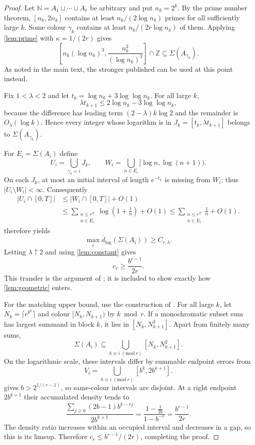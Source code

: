 \documentclass[11pt,a4paper]{article}
\theoremstyle{plain}
\theoremstyle{definition}
\theoremstyle{remark}
\newcommand{\N}{\mathbb N}
\newcommand{\dlog}{\overline d_{\log}}
\begin{document}
\label{pf:main}
\thmmain*
\begin{proof}
Let $\N=A_1\sqcup\cdots\sqcup A_r$ be arbitrary and put $n_k=2^k$.
By the prime number theorem, $[n_k,2n_k]$ contains at least
$n_k/(2\log n_k)$ primes for all sufficiently large $k$. Some colour
$\gamma_k$ contains at least $n_k/(2r\log n_k)$ of them. Applying
\cref{lem:prime} with $\kappa=1/(2r)$ gives
\begin{equation}\label{eq:primeinterval}
 \left[n_k(\log n_k)^3,\frac{n_k^2}{(\log n_k)^3}\right]\cap\mathbb Z
 \subseteq\Sigma(A_{\gamma_k}).
\end{equation}
As noted in the main text, the stronger published
\cite[Lemma~2]{CFP22} can be used at this point instead.

Fix $1<\lambda<2$ and let
$t_k=\log n_k+3\log\log n_k$. For all large $k$,
\[
 \lambda t_{k+1}\le2\log n_k-3\log\log n_k,
\]
because the difference has leading term $(2-\lambda)k\log2$ and the
remainder is $O_\lambda(\log k)$. Hence every integer whose logarithm is
in $J_k=[t_k,\lambda t_{k+1}]$ belongs to
$\Sigma(A_{\gamma_k})$.

For $E_i=\Sigma(A_i)$ define
\[
 U_i=\bigcup_{\gamma_k=i}J_k,\qquad
 W_i=\bigcup_{n\in E_i}[\log n,\log(n+1)).
\]
On each $J_k$, at most an initial interval of length $e^{-t_k}$ is
missing from $W_i$; thus $|U_i\setminus W_i|<\infty$. Consequently
\[
\begin{aligned}
 |U_i\cap[0,T]|
 &\le |W_i\cap[0,T]|+O(1)\\
 &\le\sum_{\substack{n\le e^T\\n\in E_i}}
 \log\left(1+\frac1n\right)+O(1)
 \le\sum_{\substack{n\le e^T\\n\in E_i}}\frac1n+O(1).
\end{aligned}
\]
 therefore yields
\[
 \max_i\dlog(\Sigma(A_i))\ge C_{r,\lambda}.
\]
Letting $\lambda\uparrow2$ and using \cref{lem:constant} gives
\[
 c_r\ge\frac{b^{r-1}}{2r}.
\]
This transfer is the argument of \cite[\S3 and Lemma~6]{CFP22}; it is
included to show exactly how \cref{lem:geometric} enters.

For the matching upper bound, use the construction of
\cite[Theorem~1]{CFP22}. For all large $k$, let
$N_k=\lceil e^{b^k}\rceil$ and colour $[N_k,N_{k+1})$ by $k\bmod r$.
If a monochromatic subset sum has largest summand in block $k$, it lies
in $[N_k,N_{k+1}^2]$. Apart from finitely many sums,
\[
 \Sigma(A_i)\subseteq
 \bigcup_{k\equiv i\;(\mathrm{mod}\ r)}[N_k,N_{k+1}^2].
\]
On the logarithmic scale, these intervals differ by summable endpoint
errors from
\[
 V_i=\bigcup_{k\equiv i\;(\mathrm{mod}\ r)}[b^k,2b^{k+1}].
\]
 gives $b>2^{1/(r-1)}$, so same-colour intervals are
disjoint. At a right endpoint $2b^{k+1}$ their accumulated density tends
to
\[
 \frac{\sum_{j\ge0}(2b-1)b^{k-rj}}{2b^{k+1}}
 =\frac{1-\frac1{2b}}{1-b^{-r}}
 =\frac{b^{r-1}}{2r}.
\]
The density ratio increases within an occupied interval and decreases in
a gap, so this is its limsup. Therefore
$c_r\le b^{r-1}/(2r)$, completing the proof.
\end{proof}
\end{document}
